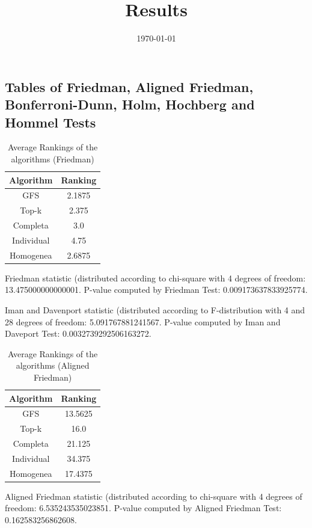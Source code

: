 \documentclass[a4paper,10pt]{article}
\title{Results}
\author{}
\date{\today}
\begin{document}
\begin{landscape}
\oddsidemargin 0in \topmargin 0in\maketitle
\section{Tables of Friedman, Aligned Friedman, Bonferroni-Dunn, Holm, Hochberg and Hommel Tests}
\begin{table}[!htp]
\centering
\caption{Average Rankings of the algorithms (Friedman)
}\begin{tabular}{c|c}
Algorithm&Ranking\\
\hline
GFS&2.1875\\
Top-k&2.375\\
Completa&3.0\\
Individual&4.75\\
Homogenea&2.6875\\
\end{tabular}
\end{table}


Friedman statistic (distributed according to chi-square with 4 degrees of freedom: 13.475000000000001. 
P-value computed by Friedman Test: 0.009173637833925774.\newline

Iman and Davenport statistic (distributed according to F-distribution with 4 and 28 degrees of freedom: 5.091767881241567. 
P-value computed by Iman and Daveport Test: 0.0032739292506163272.\newline


\newpage

\begin{table}[!htp]
\centering
\caption{Average Rankings of the algorithms (Aligned Friedman)
}\begin{tabular}{c|c}
Algorithm&Ranking\\
\hline
GFS&13.5625\\
Top-k&16.0\\
Completa&21.125\\
Individual&34.375\\
Homogenea&17.4375\\
\end{tabular}
\end{table}


Aligned Friedman statistic (distributed according to chi-square with 4 degrees of freedom: 6.535243535023851. 
P-value computed by Aligned Friedman Test: 0.162583256862608.\newline



\end{landscape}
\end{document}
